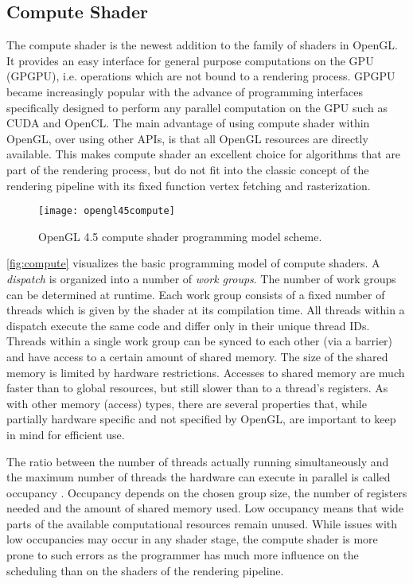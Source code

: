 \documentclass[thesis.tex]{subfiles}
\begin{document}
\subsection{Compute Shader} \label{sec:preq:compute}
The compute shader is the newest addition to the family of shaders in OpenGL.
It provides an easy interface for general purpose computations on the GPU (GPGPU), i.e. operations which are not bound to a rendering process.
GPGPU became increasingly popular with the advance of programming interfaces specifically designed to perform any parallel computation on the GPU such as CUDA and OpenCL.
The main advantage of using compute shader within OpenGL, over using other APIs, is that all OpenGL resources are directly available.
This makes compute shader an excellent choice for algorithms that are part of the rendering process, but do not fit into the classic concept of the rendering pipeline with its fixed function vertex fetching and rasterization.

\begin{figure}[h]
\centering
\texttt{[image: opengl45compute]}
\caption{\cite{bib:openglquickref} OpenGL 4.5 compute shader programming model scheme.}
\label{fig:compute}
\end{figure}
\autoref{fig:compute} visualizes the basic programming model of compute shaders.
A \emph{dispatch} is organized into a number of \emph{work groups}. 
The number of work groups can be determined at runtime. 
Each work group consists of a fixed number of threads which is given by the shader at its compilation time.
All threads within a dispatch execute the same code and differ only in their unique thread IDs.
Threads within a single work group can be synced to each other (via a barrier) and have access to a certain amount of shared memory.
The size of the shared memory is limited by hardware restrictions. 
Accesses to shared memory are much faster than to global resources, but still slower than to a thread's registers.
As with other memory (access) types, there are several properties that, while partially hardware specific and not specified by OpenGL, are important to keep in mind for efficient use.

The ratio between the number of threads actually running simultaneously and the maximum number of threads the hardware can execute in parallel is called occupancy \cite{bib:cudaprogguide, bib:amdoccupancy}.
Occupancy depends on the chosen group size, the number of registers needed and the amount of shared memory used.
Low occupancy means that wide parts of the available computational resources remain unused.
While issues with low occupancies may occur in any shader stage, the compute shader is more prone to such errors as the programmer has much more influence on the scheduling than on the shaders of the rendering pipeline.
\end{document}

